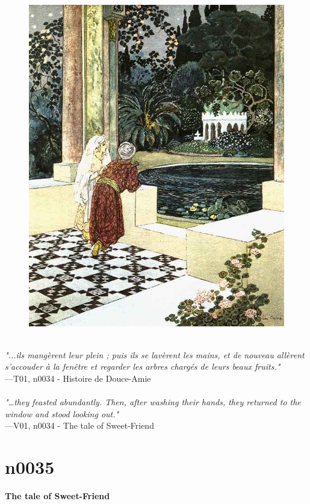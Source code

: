 \documentclass[../Carre_nights.tex]{subfiles}
\begin{document}
\begin{figure}[ht]
\centering
\includegraphics[height=\figsize]{illustrations/volume_1/T01, n0034 - Histoire de Douce-Amie.jpg}
\end{figure}

\textit{\\
"...ils mangèrent leur plein ; puis ils se lavèrent les mains, et de nouveau allèrent s’accouder à la fenêtre et regarder les arbres chargés de leurs beaux fruits."} \\
—T01, n0034 - Histoire de Douce-Amie \\~\\
\textit{"…they feasted abundantly. Then, after washing their hands, they returned to the window and stood looking out."} \\
—V01, n0034 - The tale of Sweet-Friend

\newpage

\section{n0035}
\textbf{\Large{The tale of Sweet-Friend}} \\
\end{document}
